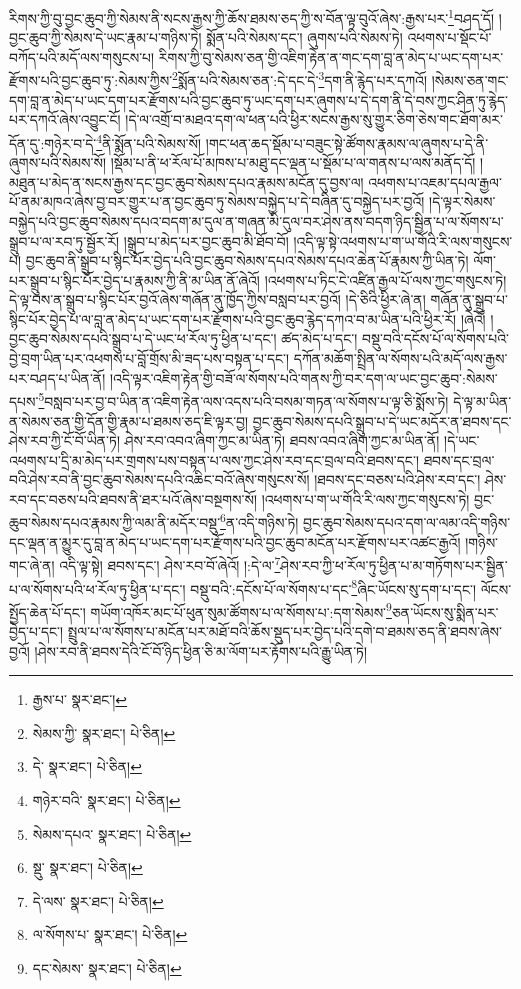 རིགས་ཀྱི་བུ་བྱང་ཆུབ་ཀྱི་སེམས་ནི་སངས་རྒྱས་ཀྱི་ཆོས་ཐམས་ཅད་ཀྱི་ས་བོན་ལྟ་བུའོ་ཞེས་:རྒྱས་པར་\footnote{རྒྱས་པ་  སྣར་ཐང་། }བཤད་དོ། །བྱང་ཆུབ་ཀྱི་སེམས་དེ་ཡང་རྣམ་པ་གཉིས་ཏེ། སྨོན་པའི་སེམས་དང་། ཞུགས་པའི་སེམས་ཏེ། འཕགས་པ་སྡོང་པོ་བཀོད་པའི་མདོ་ལས་གསུངས་པ། རིགས་ཀྱི་བུ་སེམས་ཅན་གྱི་འཇིག་རྟེན་ན་གང་དག་བླ་ན་མེད་པ་ཡང་དག་པར་རྫོགས་པའི་བྱང་ཆུབ་ཏུ་:སེམས་ཀྱིས་\footnote{སེམས་ཀྱི་  སྣར་ཐང་།  པེ་ཅིན། }སྨོན་པའི་སེམས་ཅན་:དེ་དང་དེ་\footnote{དེ་  སྣར་ཐང་།  པེ་ཅིན། }དག་ནི་རྙེད་པར་དཀའོ། །སེམས་ཅན་གང་དག་བླ་ན་མེད་པ་ཡང་དག་པར་རྫོགས་པའི་བྱང་ཆུབ་ཏུ་ཡང་དག་པར་ཞུགས་པ་དེ་དག་ནི་དེ་བས་ཀྱང་ཤིན་ཏུ་རྙེད་པར་དཀའོ་ཞེས་འབྱུང་ངོ། །དེ་ལ་འགྲོ་བ་མཐའ་དག་ལ་ཕན་པའི་ཕྱིར་སངས་རྒྱས་སུ་གྱུར་ཅིག་ཅེས་གང་ཐོག་མར་དོན་དུ་:གཉེར་བ་དེ་\footnote{གཉེར་བའི་  སྣར་ཐང་།  པེ་ཅིན། }ནི་སྨོན་པའི་སེམས་སོ། །གང་ཕན་ཆད་སྡོམ་པ་བཟུང་སྟེ་ཚོགས་རྣམས་ལ་ཞུགས་པ་དེ་ནི་ཞུགས་པའི་སེམས་སོ། །སྡོམ་པ་ནི་ཕ་རོལ་པོ་མཁས་པ་མཐུ་དང་ལྡན་པ་སྡོམ་པ་ལ་གནས་པ་ལས་མནོད་དོ། །མཐུན་པ་མེད་ན་སངས་རྒྱས་དང་བྱང་ཆུབ་སེམས་དཔའ་རྣམས་མངོན་དུ་བྱས་ལ། འཕགས་པ་འཇམ་དཔལ་རྒྱལ་པོ་ནམ་མཁའ་ཞེས་བྱ་བར་གྱུར་པ་ན་བྱང་ཆུབ་ཏུ་སེམས་བསྐྱེད་པ་དེ་བཞིན་དུ་བསྐྱེད་པར་བྱའོ། །དེ་ལྟར་སེམས་བསྐྱེད་པའི་བྱང་ཆུབ་སེམས་དཔའ་བདག་མ་དུལ་ན་གཞན་མི་དུལ་བར་ཤེས་ནས་བདག་ཉིད་སྦྱིན་པ་ལ་སོགས་པ་སྒྲུབ་པ་ལ་རབ་ཏུ་སྦྱོར་རོ། །སྒྲུབ་པ་མེད་པར་བྱང་ཆུབ་མི་ཐོབ་བོ། །འདི་ལྟ་སྟེ་འཕགས་པ་ག་ཡ་གོའི་རི་ལས་གསུངས་པ། བྱང་ཆུབ་ནི་སྒྲུབ་པ་སྙིང་པོར་བྱེད་པའི་བྱང་ཆུབ་སེམས་དཔའ་སེམས་དཔའ་ཆེན་པོ་རྣམས་ཀྱི་ཡིན་ཏེ། ལོག་པར་སྒྲུབ་པ་སྙིང་པོར་བྱེད་པ་རྣམས་ཀྱི་ནི་མ་ཡིན་ནོ་ཞེའོ། །འཕགས་པ་ཏིང་ངེ་འཛིན་རྒྱལ་པོ་ལས་ཀྱང་གསུངས་ཏེ། དེ་ལྟ་བས་ན་སྒྲུབ་པ་སྙིང་པོར་བྱའོ་ཞེས་གཞོན་ནུ་ཁྱོད་ཀྱིས་བསླབ་པར་བྱའོ། །དེ་ཅིའི་ཕྱིར་ཞེ་ན། གཞོན་ནུ་སྒྲུབ་པ་སྙིང་པོར་བྱེད་པ་ལ་བླ་ན་མེད་པ་ཡང་དག་པར་རྫོགས་པའི་བྱང་ཆུབ་རྙེད་དཀའ་བ་མ་ཡིན་པའི་ཕྱིར་རོ། །ཞེའོ། །བྱང་ཆུབ་སེམས་དཔའི་སྒྲུབ་པ་དེ་ཡང་ཕ་རོལ་ཏུ་ཕྱིན་པ་དང་། ཚད་མེད་པ་དང་། བསྡུ་བའི་དངོས་པོ་ལ་སོགས་པའི་བྱེ་བྲག་ཡིན་པར་འཕགས་པ་བློ་གྲོས་མི་ཟད་པས་བསྟན་པ་དང་། དཀོན་མཆོག་སྤྲིན་ལ་སོགས་པའི་མདོ་ལས་རྒྱས་པར་བཤད་པ་ཡིན་ནོ། །འདི་ལྟར་འཇིག་རྟེན་གྱི་བཟོ་ལ་སོགས་པའི་གནས་ཀྱི་བར་དག་ལ་ཡང་བྱང་ཆུབ་:སེམས་དཔས་\footnote{སེམས་དཔའ་  སྣར་ཐང་།  པེ་ཅིན། }བསླབ་པར་བྱ་བ་ཡིན་ན་འཇིག་རྟེན་ལས་འདས་པའི་བསམ་གཏན་ལ་སོགས་པ་ལྟ་ཅི་སྨོས་ཏེ། དེ་ལྟ་མ་ཡིན་ན་སེམས་ཅན་གྱི་དོན་གྱི་རྣམ་པ་ཐམས་ཅད་ཇི་ལྟར་བྱ། བྱང་ཆུབ་སེམས་དཔའི་སྒྲུབ་པ་དེ་ཡང་མདོར་ན་ཐབས་དང་ཤེས་རབ་ཀྱི་ངོ་བོ་ཡིན་ཏེ། ཤེས་རབ་འབའ་ཞིག་ཀྱང་མ་ཡིན་ཏེ། ཐབས་འབའ་ཞིག་ཀྱང་མ་ཡིན་ནོ། །དེ་ཡང་འཕགས་པ་དྲི་མ་མེད་པར་གྲགས་པས་བསྟན་པ་ལས་ཀྱང་ཤེས་རབ་དང་བྲལ་བའི་ཐབས་དང་། ཐབས་དང་བྲལ་བའི་ཤེས་རབ་ནི་བྱང་ཆུབ་སེམས་དཔའི་འཆིང་བའོ་ཞེས་གསུངས་སོ། །ཐབས་དང་བཅས་པའི་ཤེས་རབ་དང་། ཤེས་རབ་དང་བཅས་པའི་ཐབས་ནི་ཐར་པའོ་ཞེས་བསྔགས་སོ། །འཕགས་པ་ག་ཡ་གོའི་རི་ལས་ཀྱང་གསུངས་ཏེ། བྱང་ཆུབ་སེམས་དཔའ་རྣམས་ཀྱི་ལམ་ནི་མདོར་བསྡུ་\footnote{སྡུ་  སྣར་ཐང་།  པེ་ཅིན། }ན་འདི་གཉིས་ཏེ། བྱང་ཆུབ་སེམས་དཔའ་དག་ལ་ལམ་འདི་གཉིས་དང་ལྡན་ན་མྱུར་དུ་བླ་ན་མེད་པ་ཡང་དག་པར་རྫོགས་པའི་བྱང་ཆུབ་མངོན་པར་རྫོགས་པར་འཚང་རྒྱའོ། །གཉིས་གང་ཞེ་ན། འདི་ལྟ་སྟེ། ཐབས་དང་། ཤེས་རབ་བོ་ཞེའོ། །:དེ་ལ་\footnote{དེ་ལས་  སྣར་ཐང་།  པེ་ཅིན། }ཤེས་རབ་ཀྱི་ཕ་རོལ་ཏུ་ཕྱིན་པ་མ་གཏོགས་པར་སྦྱིན་པ་ལ་སོགས་པའི་ཕ་རོལ་ཏུ་ཕྱིན་པ་དང་། བསྡུ་བའི་:དངོས་པོ་ལ་སོགས་པ་དང་\footnote{ལ་སོགས་པ་  སྣར་ཐང་།  པེ་ཅིན། }ཞིང་ཡོངས་སུ་དག་པ་དང་། ལོངས་སྤྱོད་ཆེན་པོ་དང་། གཡོག་འཁོར་མང་པོ་ཕུན་སུམ་ཚོགས་པ་ལ་སོགས་པ་:དག་སེམས་\footnote{དང་སེམས་  སྣར་ཐང་།  པེ་ཅིན། }ཅན་ཡོངས་སུ་སྨིན་པར་བྱེད་པ་དང་། སྤྲུལ་པ་ལ་སོགས་པ་མངོན་པར་མཐོ་བའི་ཆོས་སྡུད་པར་བྱེད་པའི་དགེ་བ་ཐམས་ཅད་ནི་ཐབས་ཞེས་བྱའོ། །ཤེས་རབ་ནི་ཐབས་དེའི་ངོ་བོ་ཉིད་ཕྱིན་ཅི་མ་ལོག་པར་རྟོགས་པའི་རྒྱུ་ཡིན་ཏེ། 